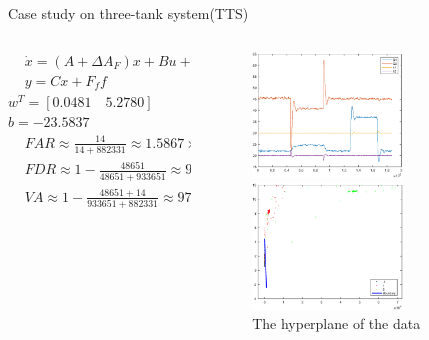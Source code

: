 \documentclass[10pt]{beamer}
\begin{document}
\begin{frame}{Case study on three-tank system(TTS)}
\begin{columns}
         \begin{column}{0.5\textwidth}
         \begin{equation}
         \begin{aligned}
     &\dot{x}=(A+\Delta A_F)x + Bu + E_ff  \\
     &y = Cx+F_ff
     \end{aligned}
 \end{equation}    
        $w^T = [0.0481 \quad 5.2780]$ $b = -23.5837$
    \begin{equation} \nonumber
  \begin{aligned}
   & FAR \approx \frac{14}{14+882331} \approx 1.5867\times 10^{-3} \% \\
   & FDR \approx 1 - \frac{48651}{48651+933651} \approx 95.05 \% \\
   & VA \approx 1 - \frac{48651+14}{933651+882331} \approx 97.32 \% 
  \end{aligned}
\end{equation}
           \end{column}
        \begin{column}{0.5\textwidth}  %
   \begin{figure}
        \centering
        \includegraphics[width=4cm]{fig/realori.eps}
        \caption{real data from TTS}
        \includegraphics[width=4cm]{fig/realdata.eps}
        \caption{The hyperplane of the data}
        \end{figure}
  
        \end{column}
    \end{columns}
\end{frame}
\end{document}
